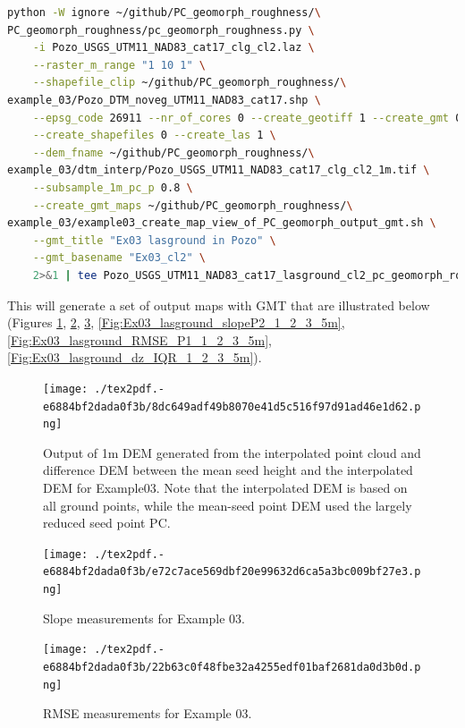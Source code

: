 \documentclass[a4paperpaper,,tablecaptionabove]{scrartcl}
\begin{document}
\begin{lstlisting}[language=bash]
python -W ignore ~/github/PC_geomorph_roughness/\
PC_geomorph_roughness/pc_geomorph_roughness.py \
    -i Pozo_USGS_UTM11_NAD83_cat17_clg_cl2.laz \
    --raster_m_range "1 10 1" \
    --shapefile_clip ~/github/PC_geomorph_roughness/\
example_03/Pozo_DTM_noveg_UTM11_NAD83_cat17.shp \
    --epsg_code 26911 --nr_of_cores 0 --create_geotiff 1 --create_gmt 0  \
    --create_shapefiles 0 --create_las 1 \
    --dem_fname ~/github/PC_geomorph_roughness/\
example_03/dtm_interp/Pozo_USGS_UTM11_NAD83_cat17_clg_cl2_1m.tif \
    --subsample_1m_pc_p 0.8 \
    --create_gmt_maps ~/github/PC_geomorph_roughness/\
example_03/example03_create_map_view_of_PC_geomorph_output_gmt.sh \
    --gmt_title "Ex03 lasground in Pozo" \
    --gmt_basename "Ex03_cl2" \
    2>&1 | tee Pozo_USGS_UTM11_NAD83_cat17_lasground_cl2_pc_geomorph_roughness_subsample_p08_1_10_1.log
\end{lstlisting}

This will generate a set of output maps with GMT that are illustrated
below (Figures \ref{Fig:Ex03_cl2_1.0m_2panel_DEMs},
\ref{Fig:Ex03_cl2_1.0m_2panel_SLPs},
\ref{Fig:Ex03_cl2_1.0m_2panel_RMSE},
\ref{Fig:Ex03_lasground_slopeP2_1_2_3_5m},
\ref{Fig:Ex03_lasground_RMSE_P1_1_2_3_5m},
\ref{Fig:Ex03_lasground_dz_IQR_1_2_3_5m}).

\begin{figure}
\centering
\texttt{[image: ./tex2pdf.-e6884bf2dada0f3b/8dc649adf49b8070e41d5c516f97d91ad46e1d62.png]}
\caption{Output of 1m DEM generated from the interpolated point cloud
and difference DEM between the mean seed height and the interpolated DEM
for Example03. Note that the interpolated DEM is based on all ground
points, while the mean-seed point DEM used the largely reduced seed
point PC.\label{Fig:Ex03_cl2_1.0m_2panel_DEMs}}
\end{figure}

\begin{figure}
\centering
\texttt{[image: ./tex2pdf.-e6884bf2dada0f3b/e72c7ace569dbf20e99632d6ca5a3bc009bf27e3.png]}
\caption{Slope measurements for Example
03.\label{Fig:Ex03_cl2_1.0m_2panel_SLPs}}
\end{figure}

\begin{figure}
\centering
\texttt{[image: ./tex2pdf.-e6884bf2dada0f3b/22b63c0f48fbe32a4255edf01baf2681da0d3b0d.png]}
\caption{RMSE measurements for Example
03.\label{Fig:Ex03_cl2_1.0m_2panel_RMSE}}
\end{figure}
\end{document}
